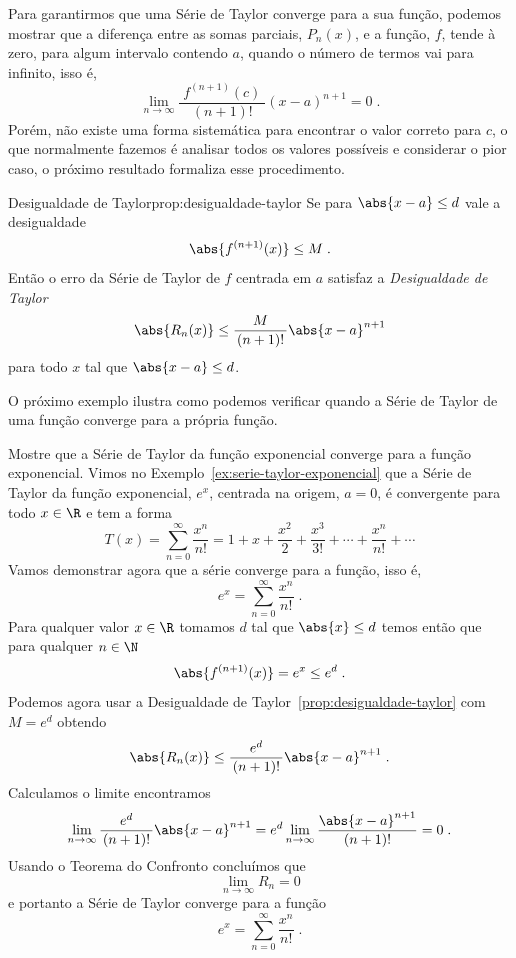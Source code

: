 Para garantirmos que uma Série de Taylor converge para a sua função,
podemos mostrar que a diferença entre as somas parciais, $P_n(x)$,
e a função, $f$, tende à zero, para algum intervalo contendo $a$,
quando o número de termos vai para infinito, isso é,
\[
  \lim_{n\to \infty} \frac{\;f^{(n+1)}(c)\;}{(n+1)!}(x-a)^{n+1} = 0    \;.
\]
Porém, não existe uma forma sistemática para encontrar o valor correto para $c$,
o que normalmente fazemos é analisar todos os valores possíveis
e considerar o pior caso, o próximo resultado formaliza esse procedimento.

\begin{proposicao}{Desigualdade de Taylor}{prop:desigualdade-taylor}
  Se para \(\abs{x-a}\leq d\) vale a desigualdade
  \[
    \abs{f^{(n+1)}(x)} \leq M    \;.
  \]
  Então o erro da Série de Taylor de $f$ centrada em $a$
  satisfaz a \emph{Desigualdade de Taylor}%
  \[
    \abs{R_n(x)} \leq \frac{M}{\,(n+1)!\,}\abs{x-a}^{n+1}
  \]
  para todo $x$ tal que \(\abs{x-a}\leq d\).
\end{proposicao}

O próximo exemplo ilustra como podemos verificar quando a Série de Taylor
de uma função converge para a própria função.

\begin{example}
  Mostre que a Série de Taylor da função exponencial converge para a função
  exponencial.
  \solution
  Vimos no Exemplo~\ref{ex:serie-taylor-exponencial} que a Série de Taylor
  da função exponencial, $e^x$, centrada na origem, $a=0$, é convergente para
  todo $x\in\R$ e tem a forma
  \[
    T(x) = \sum_{n=0}^\infty \frac{x^n}{n!}
      = 1 + x + \frac{x^2}{2} + \frac{x^3}{3!} + \cdots + \frac{x^n}{n!}+\cdots
  \]
  Vamos demonstrar agora que a série converge para a função, isso é,
  \[
    e^x = \sum_{n=0}^\infty \frac{x^n}{n!}    \;.
  \]
  Para qualquer valor $x\in\R$ tomamos $d$ tal que
  \(
    \abs{x} \leq d
  \)
  temos então que para qualquer $n\in\N$
  \[
    \abs{f^{(n+1)}(x)} = e^x \leq e^d    \;.
  \]
  Podemos agora usar a Desigualdade de Taylor~\ref{prop:desigualdade-taylor}
  com $M=e^d$ obtendo
  \[
    \abs{R_n(x)} \leq \frac{e^d}{\,(n+1)!\,}\abs{x-a}^{n+1}    \;.
  \]
  Calculamos o limite encontramos
  \[
    \lim_{n\to \infty} \frac{e^d}{\,(n+1)!\,}\abs{x-a}^{n+1} =
    e^d \lim_{n\to \infty} \frac{\abs{x-a}^{n+1}}{\,(n+1)!\,} = 0    \;.
  \]
  Usando o Teorema do Confronto concluímos que
  \[
    \lim_{n\to \infty} R_n = 0
  \]
  e portanto a Série de Taylor converge para a função
  \[
    e^x = \sum_{n=0}^\infty \frac{x^n}{n!}    \;.
  \]
\end{example}

